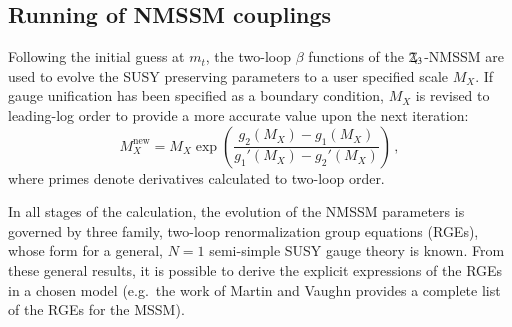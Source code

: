 \documentclass[final,3p,times,pdflatex]{elsarticle}
\newcommand{\Zv}{\,\mathbf{\backslash}\mkern-11.0mu{\mathbb{Z}}_{3}} %
\begin{document}
\subsection{Running of NMSSM couplings~\label{running}}
Following the initial guess at $m_t$, the two-loop $\beta$ functions of the 
$\Zv$-NMSSM are used to evolve the SUSY preserving parameters to a user 
specified scale $M_X$. If gauge unification has been specified as a boundary 
condition, $M_X$ is revised to leading-log order to provide a more accurate 
value upon the next iteration:
%
\begin{equation}
M_X^{\textrm{new}} = M_X \exp 
\left({\frac{g_2(M_X) - g_1(M_X)}{g_1'(M_X) - g_2'(M_X)}}\right)\,,
\label{mguteq}
\end{equation}
%
where primes denote derivatives calculated to two-loop order.   

In all stages of the calculation, the evolution of the NMSSM parameters is 
governed by three family, two-loop renormalization group equations (RGEs), whose
 form \cite{MV94,Yam94} for a general, $N=1$ semi-simple SUSY gauge 
theory is known. From these general results, it is possible to derive the 
explicit expressions of the RGEs in a chosen model (e.g.\ the work of Martin and
 Vaughn \cite{MV94} provides a complete list of the RGEs for the MSSM).  
\end{document}
